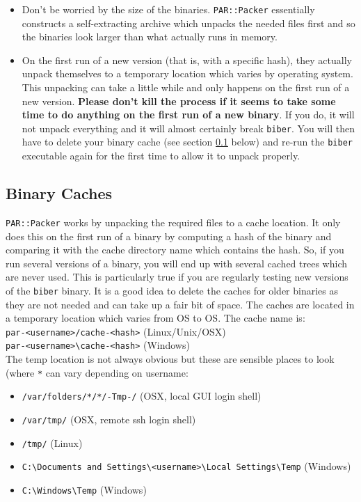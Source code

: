 \documentclass{ltxdockit}
\begin{document}
\begin{itemize}
\item Don't be worried by the size of the binaries. \verb+PAR::Packer+ essentially
  constructs a self-extracting archive which unpacks the needed files first
  and so the binaries look larger than what actually runs in memory.
\item On the first run of a new version (that is, with a specific hash),
  they actually unpack themselves to a temporary location which varies by
  operating system. This unpacking can take a little while and only happens
  on the first run of a new version. \textbf{Please don't kill the process
    if it seems to take some time to do anything on the first run of a new
    binary}. If you do, it will not unpack everything and it will almost
  certainly break \verb+biber+. You will then have to delete your binary
  cache (see section \ref{bc} below) and re-run the \verb+biber+ executable
  again for the first time to allow it to unpack properly.
\end{itemize}

\subsection{Binary Caches}\label{bc}

\verb+PAR::Packer+ works by unpacking the required files to a cache
location. It only does this on the first run of a binary 
by computing a hash of the binary and comparing it with
the cache directory name which contains the hash. So, if you run
several versions of a binary, you will end up with several cached
trees which are never used. This is particularly true if you are regularly
testing new versions of the \verb+biber+ binary. It is a good idea to
delete the caches for older binaries as they are not needed and can take up
a fair bit of space. The caches are located in a temporary location which
varies from OS to OS. The cache name is:\\[1ex]

\noindent\verb+par-<username>/cache-<hash>+ (Linux/Unix/OSX)\\
\verb+par-<username>\cache-<hash>+ (Windows)\\[1ex]

\noindent The temp location is not always obvious but these are sensible
places to look (where \verb+*+ can vary depending on username:

\begin{itemize}
\item \verb+/var/folders/*/*/-Tmp-/+ (OSX, local GUI login shell)
\item \verb+/var/tmp/+ (OSX, remote ssh login shell)
\item \verb+/tmp/+ (Linux)
\item \verb+C:\Documents and Settings\<username>\Local Settings\Temp+ (Windows)
\item \verb+C:\Windows\Temp+ (Windows)
\end{itemize}
\end{document}
